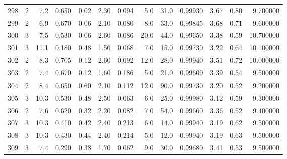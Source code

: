 \begin{tabular}{lrrrrrrrrrrrr}
298  &        2 &            7.2 &             0.650 &         0.02 &            2.30 &      0.094 &                  5.0 &                  31.0 &  0.99930 &  3.67 &       0.80 &   9.700000 \\
299  &        2 &            6.9 &             0.670 &         0.06 &            2.10 &      0.080 &                  8.0 &                  33.0 &  0.99845 &  3.68 &       0.71 &   9.600000 \\
300  &        3 &            7.5 &             0.530 &         0.06 &            2.60 &      0.086 &                 20.0 &                  44.0 &  0.99650 &  3.38 &       0.59 &  10.700000 \\
301  &        3 &           11.1 &             0.180 &         0.48 &            1.50 &      0.068 &                  7.0 &                  15.0 &  0.99730 &  3.22 &       0.64 &  10.100000 \\
302  &        2 &            8.3 &             0.705 &         0.12 &            2.60 &      0.092 &                 12.0 &                  28.0 &  0.99940 &  3.51 &       0.72 &  10.000000 \\
303  &        2 &            7.4 &             0.670 &         0.12 &            1.60 &      0.186 &                  5.0 &                  21.0 &  0.99600 &  3.39 &       0.54 &   9.500000 \\
304  &        2 &            8.4 &             0.650 &         0.60 &            2.10 &      0.112 &                 12.0 &                  90.0 &  0.99730 &  3.20 &       0.52 &   9.200000 \\
305  &        3 &           10.3 &             0.530 &         0.48 &            2.50 &      0.063 &                  6.0 &                  25.0 &  0.99980 &  3.12 &       0.59 &   9.300000 \\
306  &        2 &            7.6 &             0.620 &         0.32 &            2.20 &      0.082 &                  7.0 &                  54.0 &  0.99660 &  3.36 &       0.52 &   9.400000 \\
307  &        3 &           10.3 &             0.410 &         0.42 &            2.40 &      0.213 &                  6.0 &                  14.0 &  0.99940 &  3.19 &       0.62 &   9.500000 \\
308  &        3 &           10.3 &             0.430 &         0.44 &            2.40 &      0.214 &                  5.0 &                  12.0 &  0.99940 &  3.19 &       0.63 &   9.500000 \\
309  &        3 &            7.4 &             0.290 &         0.38 &            1.70 &      0.062 &                  9.0 &                  30.0 &  0.99680 &  3.41 &       0.53 &   9.500000 \\

\end{tabular}
